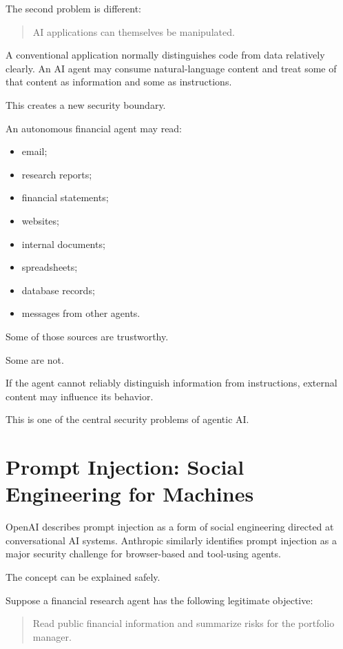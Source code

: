 The second problem is different:

\begin{quote}
AI applications can themselves be manipulated.
\end{quote}

A conventional application normally distinguishes code from data relatively clearly. An AI agent may consume natural-language content and treat some of that content as information and some as instructions.

This creates a new security boundary.

An autonomous financial agent may read:

\begin{itemize}
    \item email;
    \item research reports;
    \item financial statements;
    \item websites;
    \item internal documents;
    \item spreadsheets;
    \item database records;
    \item messages from other agents.
\end{itemize}

Some of those sources are trustworthy.

Some are not.

If the agent cannot reliably distinguish information from instructions, external content may influence its behavior.

This is one of the central security problems of agentic AI.

\section{Prompt Injection: Social Engineering for Machines}

OpenAI describes prompt injection as a form of social engineering directed at conversational AI systems. Anthropic similarly identifies prompt injection as a major security challenge for browser-based and tool-using agents.

The concept can be explained safely.

Suppose a financial research agent has the following legitimate objective:

\begin{quote}
Read public financial information and summarize risks for the portfolio manager.
\end{quote}

